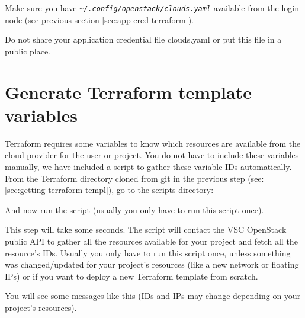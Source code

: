 \begin{prompt}
\end{prompt}

Make sure you have \texttt{\emph{\~\//.config/openstack/clouds.yaml}} available from the login node
(see previous section \ref{sec:app-cred-terraform}).

 Do not share your application credential file clouds.yaml or put this file in a public place.

\begin{prompt}
\end{prompt}

\section{Generate Terraform template variables}\label{sec:generate-terraform-variables}
\gls{Terraform} requires some variables to know which resources are available from the cloud provider for the user or project.
You do not have to include these variables manually, we have included a script to gather these variable IDs automatically.
From the Terraform directory cloned from git in the previous step (see: \ref{sec:getting-terraform-templ}),
go to the scripts directory:

\begin{prompt}
\end{prompt}

And now run the script (usually you only have to run this script once).

\begin{prompt}
\end{prompt}

This step will take some seconds. The script will contact the VSC OpenStack public API to gather
all the resources available for your project and fetch all the resource's IDs.
Usually you only have to run this script once, unless something was changed/updated for your project's
resources (like a new network or floating IPs) or if you want to deploy a new
Terraform template from scratch.

You will see some messages like this (IDs and IPs may change depending on your project's resources).

